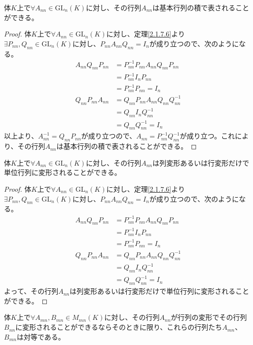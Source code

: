 \documentclass[dvipdfmx]{jsarticle}
\begin{document}
\begin{thm}\label{2.1.7.7}
体$K$上で$\forall A_{nn} \in {\mathrm{GL}}_{n}(K)$に対し、その行列$A_{nn}$は基本行列の積で表されることができる。
\end{thm}
\begin{proof} 体$K$上で$\forall A_{nn} \in {\mathrm{GL}}_{n}(K)$に対し、定理\ref{2.1.7.6}より$\exists P_{nn},Q_{nn} \in {\mathrm{GL}}_{n}(K)$に対し、$P_{nn}A_{nn}Q_{nn} = I_{n}$が成り立つので、次のようになる。
\begin{align*}
A_{nn}Q_{nn}P_{nn} &= P_{nn}^{- 1}P_{nn}A_{nn}Q_{nn}P_{nn}\\
&= P_{nn}^{- 1}I_{n}P_{nn}\\
&= P_{nn}^{- 1}P_{nn} = I_{n}\\
Q_{nn}P_{nn}A_{nn} &= Q_{nn}P_{nn}A_{nn}Q_{nn}Q_{nn}^{- 1}\\
&= Q_{nn}I_{n}Q_{nn}^{- 1}\\
&= Q_{nn}Q_{nn}^{- 1} = I_{n}
\end{align*}
以上より、$A_{nn}^{- 1} = Q_{nn}P_{nn}$が成り立つので、$A_{nn} = P_{nn}^{- 1}Q_{nn}^{- 1}$が成り立つ。これにより、その行列$A_{nn}$は基本行列の積で表されることができる。
\end{proof}
\begin{thm}\label{2.1.7.8}
体$K$上で$\forall A_{nn} \in {\mathrm{GL}}_{n}(K)$に対し、その行列$A_{nn}$は列変形あるいは行変形だけで単位行列に変形されることができる。
\end{thm}
\begin{proof} 体$K$上で$\forall A_{nn} \in {\mathrm{GL}}_{n}(K)$に対し、定理\ref{2.1.7.6}より$\exists P_{nn},Q_{nn} \in {\mathrm{GL}}_{n}(K)$に対し、$P_{nn}A_{nn}Q_{nn} = I_{n}$が成り立つので、次のようになる。
\begin{align*}
A_{nn}Q_{nn}P_{nn} &= P_{nn}^{- 1}P_{nn}A_{nn}Q_{nn}P_{nn}\\
&= P_{nn}^{- 1}I_{n}P_{nn}\\
&= P_{nn}^{- 1}P_{nn} = I_{n}\\
Q_{nn}P_{nn}A_{nn} &= Q_{nn}P_{nn}A_{nn}Q_{nn}Q_{nn}^{- 1}\\
&= Q_{nn}I_{n}Q_{nn}^{- 1}\\
&= Q_{nn}Q_{nn}^{- 1} = I_{n}
\end{align*}
よって、その行列$A_{nn}$は列変形あるいは行変形だけで単位行列に変形されることができる。
\end{proof}
\begin{thm}\label{2.1.7.9}
体$K$上で$\forall A_{mn},B_{mn} \in M_{mn}(K)$に対し、その行列$A_{nn}$が行列の変形でその行列$B_{nn}$に変形されることができるならそのときに限り、これらの行列たち$A_{mn}$、$B_{mn}$は対等である。
\end{thm}
\end{document}

